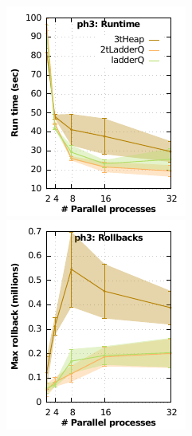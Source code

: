 \begin{figure}
\begin{minipage}{0.32\linewidth}
\begin{minipage}{0.49\linewidth}
\includegraphics[width=\linewidth]{images/ph3_Delay_10_Evt_10_run_time}
\end{minipage}
\begin{minipage}{0.49\linewidth}
\includegraphics[width=\linewidth]{images/ph3_Delay_10_Evt_10_rollbacks}

\end{minipage}
\end{minipage}
\end{figure}
